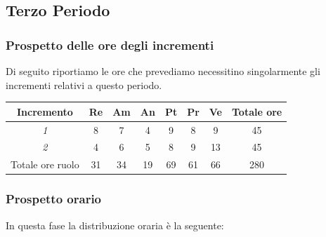 {{{{{{{{{{{{\subsection{Terzo Periodo}\label{PreventivoFaseDiProgettazioneDiDettaglioECodificaPeriodo3}

\subsubsection{Prospetto delle ore degli incrementi}\label{PreventivoFaseDiProgettazioneDiDettaglioECodificaPeriodo3Incrementi}
Di seguito riportiamo le ore che prevediamo necessitino singolarmente gli incrementi relativi a questo periodo.
\quad
\def\tabularxcolumn#1{m{#1}}
{
	
	\begin{center}
		\renewcommand{\arraystretch}{1.4}
		\begin{tabularx}{\textwidth}{|c|c|c|c|c|c|c|c|}
			\hline
			\rowcolor{airforceblue}
			\textbf{Incremento} & \textbf{Re} & \textbf{Am} & \textbf{An} & \textbf{Pt} & \textbf{Pr} & \textbf{Ve} & \textbf{Totale ore}\\
			\hline
			\textit{1} & 8 & 7 & 4 & 9 & 8 & 9 & 45\\
			\hline
			\textit{2} & 4 & 6 & 5 & 8 & 9 & 13 & 45\\
			\hline
			Totale ore ruolo & 31 & 34 & 19 & 69 & 61 & 66 & 280\\
			\hline
		\end{tabularx}
	\end{center}
	
	\subsubsection{Prospetto orario}\label{PreventivoFaseDiProgettazioneDiDettaglioECodificaProspettoOrarioPeriodo3}
	In questa fase la distribuzione oraria è la seguente:
	\quad
	\def\tabularxcolumn#1{m{#1}}
	{
		
}}}}}}}}}}}}}}
